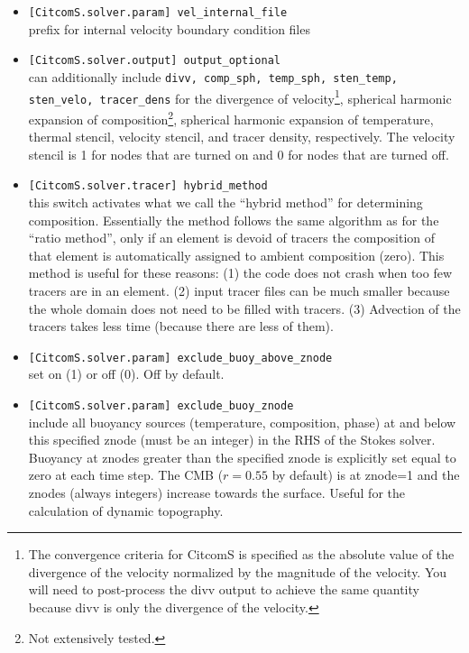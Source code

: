\documentclass[letterpaper,12pt]{article}
\begin{document}
\begin{itemize}
\item \verb#[CitcomS.solver.param] vel_internal_file#\\ prefix for internal velocity boundary condition files
\item \verb#[CitcomS.solver.output] output_optional#\\ can additionally include \verb#divv, comp_sph, temp_sph, sten_temp, sten_velo, tracer_dens# for the divergence of velocity\footnote{The convergence criteria for CitcomS is specified as the absolute value of the divergence of the velocity normalized by the magnitude of the velocity.  You will need to post-process the divv output to achieve the same quantity because divv is only the divergence of the velocity.}, spherical harmonic expansion of composition\footnote{Not extensively tested.}, spherical harmonic expansion of temperature, thermal stencil, velocity stencil, and tracer density, respectively.  The velocity stencil is 1 for nodes that are turned on and 0 for nodes that are turned off.
\item \verb#[CitcomS.solver.tracer] hybrid_method#\\ this switch activates what we call the ``hybrid method'' for determining composition.  Essentially the method follows the same algorithm as for the ``ratio method'', only if an element is devoid of tracers the composition of that element is automatically assigned to ambient composition (zero).  This method is useful for these reasons: (1) the code does not crash when too few tracers are in an element.  (2) input tracer files can be much smaller because the whole domain does not need to be filled with tracers.  (3) Advection of the tracers takes less time (because there are less of them).
\item \verb#[CitcomS.solver.param] exclude_buoy_above_znode#\\ set on (1) or off (0).  Off by default.
\item \verb#[CitcomS.solver.param] exclude_buoy_znode#\\ include all buoyancy sources (temperature, composition, phase) at and below this specified znode (must be an integer) in the RHS of the Stokes solver.  Buoyancy at znodes greater than the specified znode is explicitly set equal to zero at each time step.  The CMB ($r=0.55$ by default) is at znode=1 and the znodes (always integers) increase towards the surface.  Useful for the calculation of dynamic topography.
\end{itemize}
\end{document}
